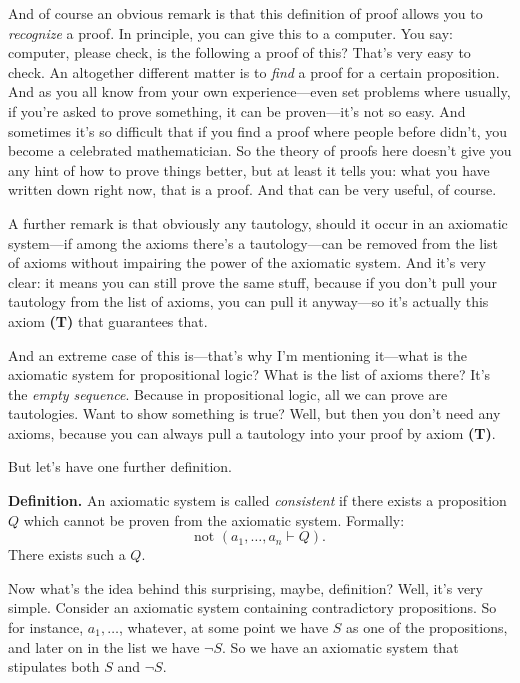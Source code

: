 And of course an obvious remark is that this definition of proof allows you to \emph{recognize} a proof. In principle, you can give this to a computer. You say: computer, please check, is the following a proof of this? That's very easy to check. An altogether different matter is to \emph{find} a proof for a certain proposition. And as you all know from your own experience---even set problems where usually, if you're asked to prove something, it can be proven---it's not so easy. And sometimes it's so difficult that if you find a proof where people before didn't, you become a celebrated mathematician. So the theory of proofs here doesn't give you any hint of how to prove things better, but at least it tells you: what you have written down right now, that is a proof. And that can be very useful, of course.

A further remark is that obviously any tautology, should it occur in an axiomatic system---if among the axioms there's a tautology---can be removed from the list of axioms without impairing the power of the axiomatic system. And it's very clear: it means you can still prove the same stuff, because if you don't pull your tautology from the list of axioms, you can pull it anyway---so it's actually this axiom \textbf{(T)} that guarantees that.

And an extreme case of this is---that's why I'm mentioning it---what is the axiomatic system for propositional logic? What is the list of axioms there? It's the \emph{empty sequence}. Because in propositional logic, all we can prove are tautologies. Want to show something is true? Well, but then you don't need any axioms, because you can always pull a tautology into your proof by axiom \textbf{(T)}.

But let's have one further definition.

\textbf{Definition.} An axiomatic system is called \emph{consistent} if there exists a proposition $Q$ which cannot be proven from the axiomatic system. Formally:
\[
\text{not } (a_1, \ldots, a_n \vdash Q).
\]
There exists such a $Q$.

Now what's the idea behind this surprising, maybe, definition? Well, it's very simple. Consider an axiomatic system containing contradictory propositions. So for instance, $a_1, \ldots$, whatever, at some point we have $S$ as one of the propositions, and later on in the list we have $\lnot S$. So we have an axiomatic system that stipulates both $S$ and $\lnot S$.

